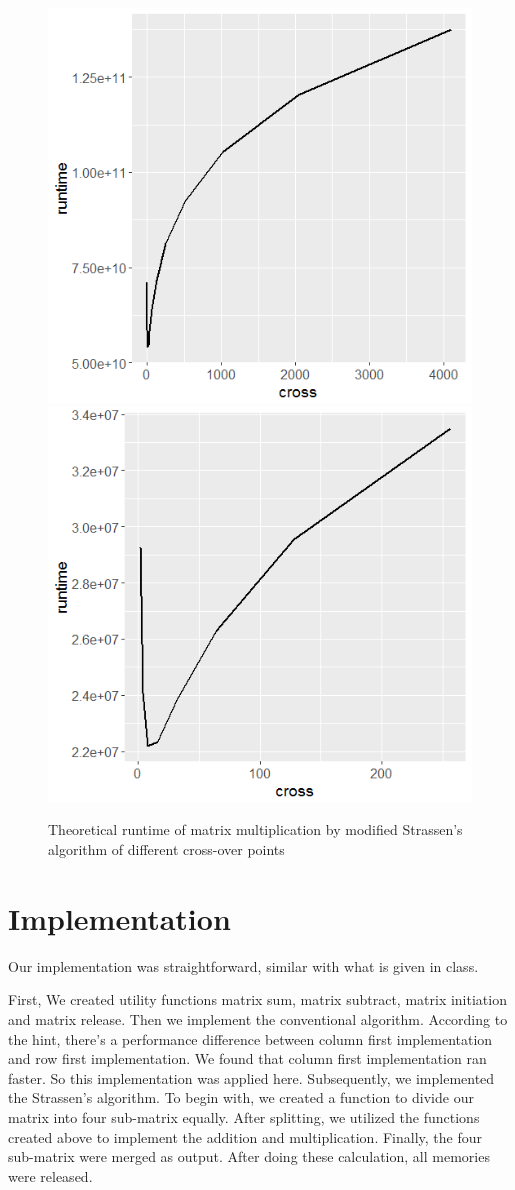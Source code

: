\documentclass[a4paper, 11pt]{article}
\begin{document}
\begin{figure}[h]
	\includegraphics[width=0.5\linewidth]{Truntime}
	\includegraphics[width=0.5\linewidth]{Truntime8}
	\caption{Theoretical runtime of matrix multiplication by modified Strassen's algorithm of different cross-over points}
	\label{fig:truntime}
\end{figure}

\section*{Implementation}
Our implementation was straightforward, similar with what is given in class.

 First, We created utility functions matrix sum, matrix subtract, matrix initiation and matrix release. Then we implement the conventional algorithm. According to the hint, there's a performance difference between column first implementation and row first implementation. We found that column first implementation ran faster. So this implementation was applied here. Subsequently, we implemented the Strassen's algorithm. To begin with, we created a function to divide our matrix into four sub-matrix equally. After splitting, we utilized the functions created above to implement the addition and multiplication. Finally, the four sub-matrix were merged as output. After doing these calculation, all memories were released.
\end{document}
